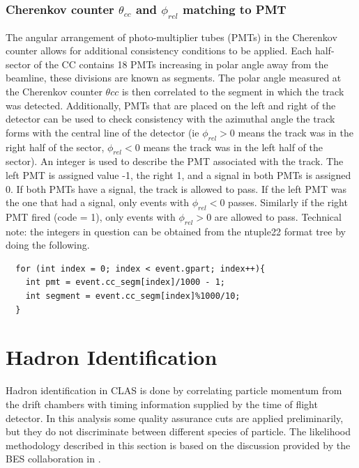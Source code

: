 \subsubsection*{Cherenkov counter $\theta_{cc}$ and $\phi_{rel}$ matching to PMT}
The angular arrangement of photo-multiplier tubes (PMTs) in the Cherenkov counter allows for additional consistency conditions to be applied.  Each half-sector of the CC contains 18 PMTs increasing in polar angle away from the beamline, these divisions are known as segments.  The polar angle measured at the Cherenkov counter $\theta{cc}$ is then correlated to the segment in which the track was detected.  Additionally, PMTs that are placed on the left and right of the detector can be used to check consistency with the azimuthal angle the track forms with the central line of the detector (ie $\phi_{rel} > 0$ means the track was in the right half of the sector, $\phi_{rel} < 0$ means the track was in the left half of the sector).  An integer is used to describe the PMT associated with the track.  The left PMT is assigned value -1, the right 1, and a signal in both PMTs is assigned 0.  If both PMTs have a signal, the track is allowed to pass.  If the left PMT was the one that had a signal, only events with $\phi_{rel} < 0$ passes.  Similarly if the right PMT fired (code = 1), only events with $\phi_{rel} > 0$ are allowed to pass.  Technical note: the integers in question can be obtained from the ntuple22 format tree by doing the following.

\begin{lstlisting}
  for (int index = 0; index < event.gpart; index++){
    int pmt = event.cc_segm[index]/1000 - 1;
    int segment = event.cc_segm[index]%1000/10; 
  }
\end{lstlisting}


\section{Hadron Identification}
Hadron identification in CLAS is done by correlating particle momentum from the drift chambers with timing information supplied by the time of flight detector.  In this analysis some quality assurance cuts are applied preliminarily, but they do not discriminate between different species of particle.  The likelihood methodology described in this section is based on the discussion provided by the BES collaboration in \cite{misc-ping:2009}.  

